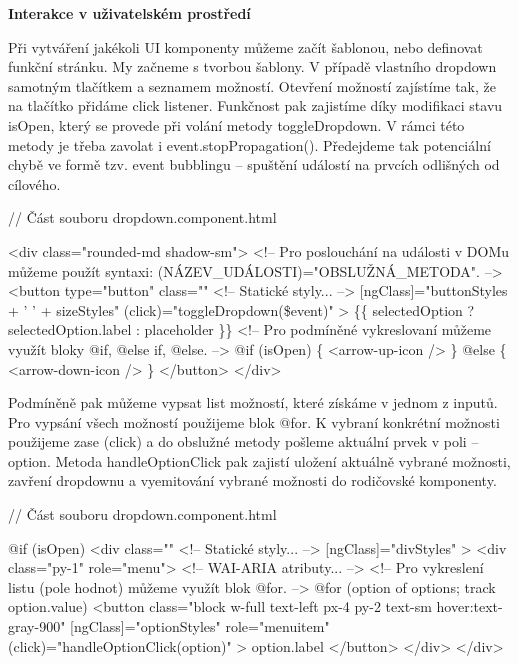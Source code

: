 \begin{flushleft}
  \textbf{Interakce v uživatelském prostředí}
\end{flushleft}

Při vytváření jakékoli UI komponenty můžeme začít šablonou, nebo definovat funkční stránku. My začneme s tvorbou šablony. V případě vlastního dropdown samotným tlačítkem a seznamem možností. 
Otevření možností zajístíme tak, že na tlačítko přidáme click listener. Funkčnost pak zajistíme díky modifikaci stavu isOpen, který se provede při volání metody toggleDropdown. 
V rámci této metody je třeba zavolat i event.stopPropagation(). Předejdeme tak potenciální chybě ve formě tzv. event bubblingu -- spuštění událostí na prvcích odlišných od cílového.

\begin{prog}
// Část souboru dropdown.component.html

<div class="rounded-md shadow-sm">
  <!-- Pro poslouchání na události v DOMu můžeme 
    použít syntaxi: (NÁZEV_UDÁLOSTI)="OBSLUŽNÁ_METODA". -->
  <button
    type="button"
    class="" <!-- Statické styly... -->
    [ngClass]="buttonStyles + ' ' + sizeStyles"
    (click)="toggleDropdown(\$event)"
  >
    \{\{ selectedOption ? selectedOption.label : placeholder \}\}
    <!-- Pro podmíněné vykreslovaní můžeme využít bloky @if, @else if, @else. -->
    @if (isOpen) \{
      <arrow-up-icon />
    \} @else \{
      <arrow-down-icon />
    \}
  </button>
</div>
\end{prog}

Podmíněně pak můžeme vypsat list možností, které získáme v jednom z inputů. Pro vypsání všech možností použijeme blok @for. 
K vybraní konkrétní možnosti použijeme zase (click) a do obslužné metody pošleme aktuální prvek v poli -- option. 
Metoda handleOptionClick pak zajistí uložení aktuálně vybrané možnosti, zavření dropdownu a vyemitování vybrané možnosti do rodičovské komponenty.

\begin{prog}
// Část souboru dropdown.component.html

@if (isOpen) {
  <div
    class="" <!-- Statické styly... -->
    [ngClass]="divStyles"
  >
    <div class="py-1" role="menu"> <!-- WAI-ARIA atributy... -->
      <!-- Pro vykreslení listu (pole hodnot) můžeme využít blok @for. -->
      @for (option of options; track option.value) {
        <button
          class="block w-full text-left px-4 py-2 text-sm hover:text-gray-900"
          [ngClass]="optionStyles"
          role="menuitem"
          (click)="handleOptionClick(option)"
        >
          {{ option.label }}
        </button>
      }
    </div>
  </div>
}
\end{prog}


